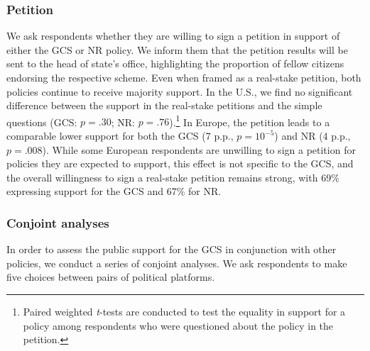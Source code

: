\subsubsection{Petition}\label{subsubsec:petition} %

We ask respondents whether they are willing to sign a petition in support of either the GCS or NR policy. We inform them that the petition results will be sent to the head of state's office, highlighting the proportion of fellow citizens endorsing the respective scheme. Even when framed as a real-stake petition, both policies continue to receive majority support. In the U.S., we find no significant difference between the support in the real-stake petitions and the simple questions (GCS: $p=.30$; NR: $p=.76$).\footnote{Paired weighted \textit{t}-tests are conducted to test the equality in support for a policy among respondents who were questioned about the policy in the petition.} In Europe, the petition leads to a comparable lower support for both the GCS (7 p.p., $p=10^{-5}$) and NR (4 p.p., $p = .008$). While some European respondents are unwilling to sign a petition for policies they are expected to support, this effect is not specific to the GCS, and the overall willingness to sign a real-stake petition remains strong, with 69\% expressing support for the GCS and 67\% for NR.

\subsubsection{Conjoint analyses}\label{subsubsec:conjoint} %

In order to assess the public support for the GCS in conjunction with other policies, we conduct a series of conjoint analyses. We ask respondents to make five choices between pairs of political platforms.

